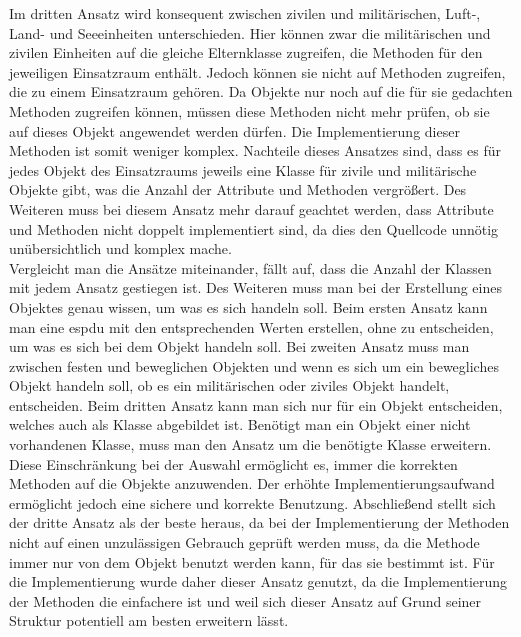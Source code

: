 Im dritten Ansatz wird konsequent zwischen zivilen und militärischen, Luft-, Land- und Seeeinheiten unterschieden. Hier können zwar die militärischen und zivilen Einheiten auf die gleiche Elternklasse zugreifen, die Methoden für den jeweiligen Einsatzraum enthält. Jedoch können sie nicht auf Methoden zugreifen, die zu einem Einsatzraum gehören. Da Objekte nur noch auf die für sie gedachten Methoden zugreifen können, müssen diese Methoden nicht mehr prüfen, ob sie auf dieses Objekt angewendet werden dürfen. Die Implementierung dieser Methoden ist somit weniger komplex. Nachteile dieses Ansatzes sind, dass es für jedes Objekt des Einsatzraums jeweils eine Klasse für zivile und militärische Objekte gibt, was die Anzahl der Attribute und Methoden vergrößert. Des Weiteren  muss bei diesem Ansatz mehr darauf geachtet werden, dass Attribute und Methoden  nicht doppelt implementiert sind, da dies den Quellcode unnötig unübersichtlich und komplex mache. 
\\
Vergleicht man die Ansätze miteinander, fällt auf, dass die Anzahl der Klassen mit jedem Ansatz gestiegen ist. Des Weiteren muss man bei der Erstellung eines Objektes genau wissen, um was es sich handeln soll.
Beim ersten Ansatz kann man eine \ac{espdu} mit den entsprechenden Werten erstellen, ohne zu entscheiden, um was es sich bei dem Objekt handeln soll. Bei zweiten Ansatz muss man zwischen festen und beweglichen Objekten und wenn es sich um ein bewegliches Objekt handeln soll, ob es ein militärischen oder ziviles Objekt handelt, entscheiden. Beim dritten Ansatz kann man sich nur für ein Objekt entscheiden, welches auch als Klasse abgebildet ist. Benötigt man ein Objekt einer nicht vorhandenen Klasse, muss man den Ansatz um die benötigte Klasse erweitern. Diese Einschränkung bei der Auswahl ermöglicht es, immer die korrekten Methoden auf die Objekte anzuwenden. Der erhöhte Implementierungsaufwand ermöglicht jedoch eine sichere und korrekte Benutzung. 
Abschließend stellt sich der dritte Ansatz als der beste heraus, da bei der Implementierung der Methoden nicht auf einen unzulässigen Gebrauch geprüft werden muss, da die Methode immer nur von dem Objekt benutzt werden kann, für das sie bestimmt ist. Für die Implementierung wurde daher dieser Ansatz genutzt, da die Implementierung der Methoden die einfachere ist und weil sich dieser Ansatz auf Grund seiner Struktur  potentiell am  besten erweitern lässt.  

